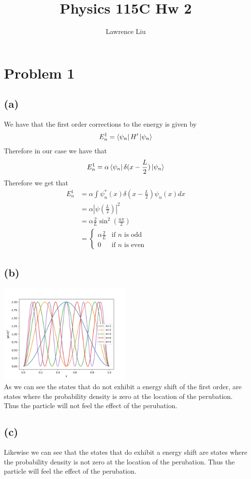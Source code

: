\documentclass[11pt]{article}
\author{Lawrence Liu}
\title{Physics 115C Hw 2}
\begin{document}
\maketitle
\section*{Problem 1}
\subsection*{(a)}
We have that the first order corrections to the energy is given by 
$$
E_{n}^{1}=\bra{\psi_n}H'\ket{\psi_n}
$$
Therefore in our case we have that 
$$
    E_{n}^{1}=\alpha\bra{\psi_n}\delta(x-\frac{L}{2})\ket{\psi_n}
$$
Therefore we get that 
\begin{align*}
    E_{n}^{1}&=\alpha\int
    \psi_n^*(x) \delta(x-\frac{L}{2})\psi_n(x)dx\\
    &=\alpha |\psi(\frac{L}{2})|^2 \\
    &= \alpha \frac{2}{L} \sin^2\left(\frac{n\pi}{2}\right)\\
    &=\begin{cases}
    \alpha \frac{2}{L} & \text{if $n$ is odd}\\
    0 & \text{if $n$ is even}
    \end{cases}
\end{align*}
\subsection*{(b)}
\includegraphics*[width=0.5\textwidth]{wavefunction.png}\\
As we can see the states that do not exhibit a energy 
shift of the first order, are states where the probability
density is zero at the location of the perubation. Thus the 
particle will not feel the effect of the perubation.
\subsection*{(c)}
Likewise we can see that the states that do exhibit a energy
shift are states where the probability density is not zero at the
location of the perubation. Thus the particle will feel the effect
of the perubation.
\end{document}
